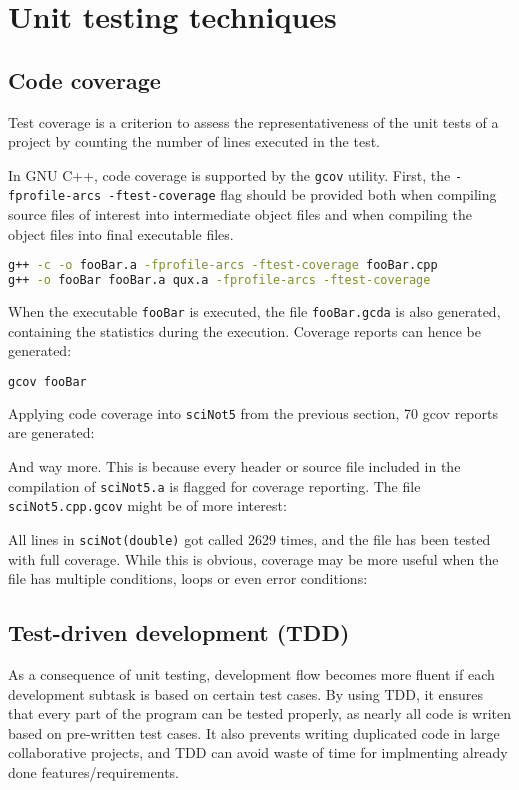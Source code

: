 \section{Unit testing techniques}
\subsection{Code coverage}
Test coverage is a criterion to assess the representativeness of the unit tests of a project by counting the number of lines executed in the test.

In GNU C++, code coverage is supported by the \texttt{gcov} utility.
First, the \texttt{-fprofile-arcs -ftest-coverage} flag should be provided both
when compiling source files of interest into intermediate object files
and when compiling the object files into final executable files.

\begin{lstlisting}[style=Cpp, language=bash]
g++ -c -o fooBar.a -fprofile-arcs -ftest-coverage fooBar.cpp
g++ -o fooBar fooBar.a qux.a -fprofile-arcs -ftest-coverage
\end{lstlisting}

When the executable \texttt{fooBar} is executed, the file \texttt{fooBar.gcda} is also generated,
containing the statistics during the execution. Coverage reports can hence be generated:

\begin{lstlisting}[style=Cpp, language=bash]
gcov fooBar
\end{lstlisting}

Applying code coverage into \texttt{sciNot5} from the previous section, 70 gcov reports are generated:



And way more. This is because every header or source file included in the compilation of \texttt{sciNot5.a}
is flagged for coverage reporting. The file \texttt{sciNot5.cpp.gcov} might be of more interest:


All lines in \texttt{sciNot(double)} got called 2629 times, and the file has been tested with full coverage.
While this is obvious, coverage may be more useful when the file has multiple conditions, loops or even error conditions:


\subsection{Test-driven development (TDD)}
As a consequence of unit testing, development flow becomes more fluent if each development subtask is based on certain test cases. By using TDD, it ensures that every part of the program can be tested properly, as nearly all code is writen based on pre-written test cases. It also prevents writing duplicated code in large collaborative projects, and TDD can avoid waste of time for implmenting already done features/requirements. 

